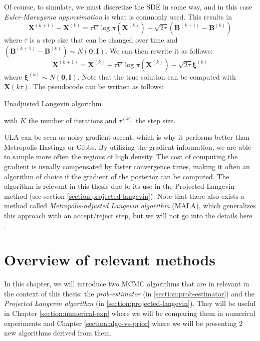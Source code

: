 \documentclass[12pt]{memoir}
\newcommand{\mb}{\mathbf}
\newcommand{\ti}{\textit}
\begin{document}
Of course, to simulate, we must discretize the SDE in some way, and in this case \textit{Euler-Maruyama approximation} is what is commonly used. This results in
\begin{equation}
    \mb X^{(k+1)} - \mb X^{(k)} = \tau \nabla \log\pi(\mb X^{(k)}) + \sqrt{2\tau}(\mb B^{(k+1)} - \mb B^{(k)})
\end{equation}
where $\tau$ is a step size that can be changed over time and $(\mb B^{(k+1)} - \mb B^{(k)}) \sim N(\mb 0, \mb I)$. We can then rewrite it as follows:
\begin{equation}
    \mb X^{(k+1)} = \mb X^{(k)} + \tau \nabla \log\pi(\mb X^{(k)}) + \sqrt{2\tau}\boldsymbol{\xi}^{(k)}
\end{equation}
where $\boldsymbol{\xi}^{(k)} \sim N(\mb 0, \mb I)$. Note that the true solution can be computed with $\mb X(k\tau)$. The pseudocode can be written as follows:\medbreak
\begin{algorithm}[H]
    \DontPrintSemicolon

    \Input{$\mb x^{(0)}, K, \tau^{(1)}, \dots, \tau^{(K)}$}
    \Output{$\mb x^{(1)}, \mb x^{(2)}, \dots, \mb x^{(K)}$}
    \For{$k\gets 1:K$}{ 
        $\boldsymbol{\xi}^{(k)} \sim N(\mb 0, \mb I)$\;
        $\mb x^{(k+1)} = \mb x^{(k)} + \tau^{(k)} \nabla \log\pi(\mb x^{(k)}) + \sqrt{2\tau^{(k)}}\boldsymbol{\xi}^{(k)}$\;
    }
    \caption{Unadjusted Langevin algorithm}
\end{algorithm}
with $K$ the number of iterations and $\tau^{(k)}$ the step size.  \medbreak

ULA can be seen as noisy gradient ascent, which is why it performs better than Metropolis-Hastings or Gibbs. By utilizing the gradient information, we are able to sample more often the regions of high density. The cost of computing the gradient is usually compensated by faster convergence times, making it often an algorithm of choice if the gradient of the posterior can be computed. The algorithm is relevant in this thesis due to its use in the Projected Langevin method (see section \ref{section:projected-langevin}). Note that there also exists a method called \textit{Metropolis-adjusted Langevin algorithm} (MALA), which generalizes this approach with an accept/reject step, but we will not go into the details here \cite{mcmc:langenvin-blog:Ansari2024Apr, wiki:MALA}.

\chapter{Overview of relevant methods} \label{section:relevant-methods}
In this chapter, we will introduce two MCMC algorithms that are in relevant in the context of this thesis: the \ti{prob-estimator} (in \ref{section:prob-estimator}) and the \ti{Projected Langevin algorithm} (in \ref{section:projected-langevin}). They will be useful in Chapter \ref{section:numerical-exp} where we will be comparing them in numerical experiments and Chapter \ref{section:algo-vs-prior} where we will be presenting 2 new algorithms derived from them.\medbreak
\end{document}
